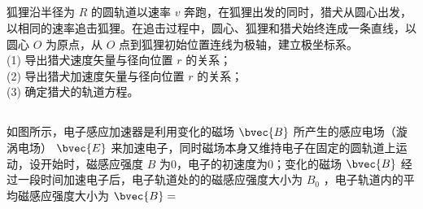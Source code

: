 \subsection{ }
狐狸沿半径为 $R$ 的圆轨道以速率 $v$ 奔跑，在狐狸出发的同时，猎犬从圆心出发，以相同的速率追击狐狸。在追击过程中，圆心、狐狸和猎犬始终连成一条直线，以圆心 $O$ 为原点，从 $O$ 点到狐狸初始位置连线为极轴，建立极坐标系。\\
(1) 导出猎犬速度矢量与径向位置 $r$ 的关系；\\
(2) 导出猎犬加速度矢量与径向位置 $r$ 的关系；\\
(3) 确定猎犬的轨道方程。

\subsection{ }
如图所示，电子感应加速器是利用变化的磁场 $\bvec{B}$ 所产生的感应电场（漩涡电场） $\bvec{E}$ 来加速电子，同时磁场本身又维持电子在固定的圆轨道上运动，设开始时，磁感应强度 $B$ 为0，电子的初速度为0；变化的磁场 $\bvec{B}$ 经过一段时间加速电子后，电子轨道处的的磁感应强度大小为 $B_{0}$ ，电子轨道内的平均磁感应强度大小为 $\bvec{B} = $

